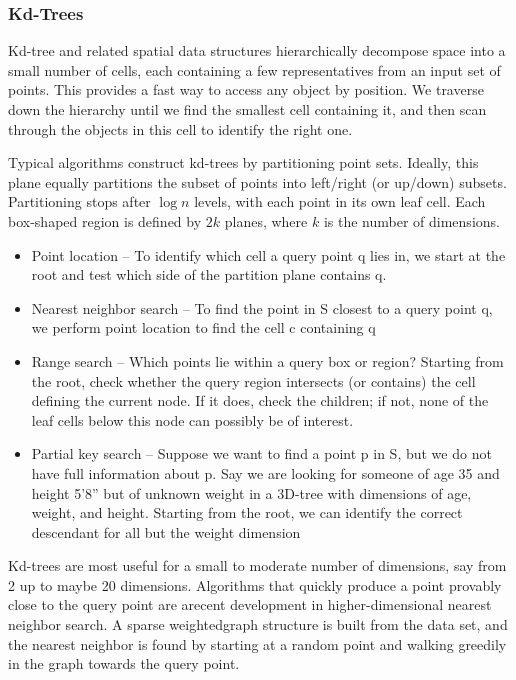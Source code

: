 \documentclass{article}
\begin{document}
    
    \subsubsection{Kd-Trees}
    Kd-tree and related spatial data structures hierarchically decompose space into a small number of cells, each containing a few representatives from an input set of points. This provides a fast way to access any object by position. We traverse down the hierarchy until we find the smallest cell containing it, and then scan through the objects in this cell to identify the right one.
    
    Typical algorithms construct kd-trees by partitioning point sets. Ideally, this plane equally partitions the subset of points into left/right (or up/down) subsets. Partitioning stops after $\log n$ levels, with each point in its own leaf cell. Each box-shaped region is defined by $2k$ planes, where $k$ is the number of dimensions.
    
    \begin{itemize}
        \item Point location – To identify which cell a query point q lies in, we start at the root and test which side of the partition plane contains q. 
        
        \item Nearest neighbor search – To find the point in S closest to a query point q, we perform point location to find the cell c containing q
        
        \item Range search – Which points lie within a query box or region? Starting from the root, check whether the query region intersects (or contains) the cell defining the current node. If it does, check the children; if not, none of the leaf cells below this node can possibly be of interest.
        
        \item Partial key search – Suppose we want to find a point p in S, but we do not have full information about p. Say we are looking for someone of age 35 and height 5’8” but of unknown weight in a 3D-tree with dimensions of age, weight, and height. Starting from the root, we can identify the correct descendant for all but the weight dimension
    \end{itemize}
    
    Kd-trees are most useful for a small to moderate number of dimensions, say from 2 up to maybe 20 dimensions. Algorithms that quickly produce a point provably close to the query point are arecent development in higher-dimensional nearest neighbor search. A sparse weightedgraph structure is built from the data set, and the nearest neighbor is found by starting at a random point and walking greedily in the graph towards the query point.
    
\end{document}
